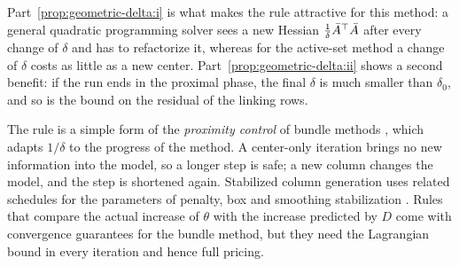 Part~\ref{prop:geometric-delta:i} is what makes the rule attractive for this method: a general
quadratic programming solver sees a new Hessian $\frac{1}{\delta}\bar{A}^\top\bar{A}$ after every
change of $\delta$ and has to refactorize it, whereas for the active-set method a change of
$\delta$ costs as little as a new center. Part~\ref{prop:geometric-delta:ii} shows a second
benefit: if the run ends in the proximal phase, the final $\delta$ is much smaller than
$\delta_0$, and so is the bound on the residual of the linking rows.

\medskip

The rule is a simple form of the \emph{proximity control} of bundle methods
\cite{kiwiel1990proximity}, which adapts $1/\delta$ to the progress of the method. A
center-only iteration brings no new information into the model, so a longer step is safe; a
new column changes the model, and the step is shortened again. Stabilized column generation
uses related schedules for the parameters of penalty, box and smoothing stabilization
\cite{dumerle1999stabilized, benamor2009choice, pessoa2018automation}. Rules that compare the
actual increase of $\theta$ with the increase predicted by $D$ come with convergence guarantees
for the bundle method, but they need the Lagrangian bound in every iteration and hence full
pricing.
